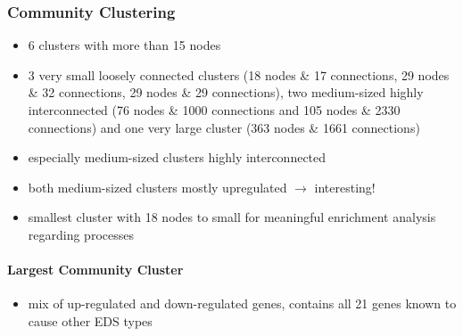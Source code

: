 \subsubsection{Community Clustering}

\begin{itemize}
	\item 6 clusters with more than 15 nodes
	\item 3 very small loosely connected clusters (18 nodes \& 17 connections, 29 nodes \& 32 connections, 29 nodes \& 29 connections), two medium-sized highly interconnected (76 nodes \& 1000 connections and 105 nodes \& 2330 connections) and one very large cluster (363 nodes \& 1661 connections)
	\item especially medium-sized clusters highly interconnected
	\item both medium-sized clusters mostly upregulated $\rightarrow$ interesting!
	\item smallest cluster with 18 nodes to small for meaningful enrichment analysis regarding processes
\end{itemize}

\paragraph{Largest Community Cluster}

\begin{itemize}
  \item mix of up-regulated and down-regulated genes, contains all 21 genes known to cause other EDS types
\end{itemize}

